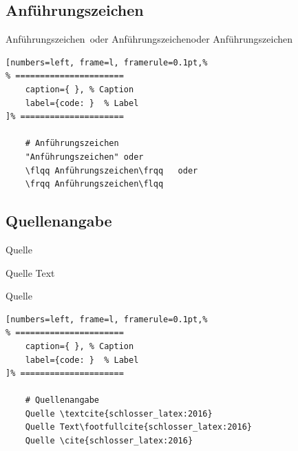 \subsection{Anführungszeichen}\label{anfuehrungszeichen}

\frqq Anführungszeichen\flqq\, oder \flqq Anführungszeichen\frqq   oder
\frqq Anführungszeichen\flqq

\lstset{language=Bash} %
\begin{lstlisting}[numbers=left, frame=l, framerule=0.1pt,%
% ======================
	caption={ }, % Caption
	label={code: }  % Label
]% =====================

    # Anführungszeichen
    "Anführungszeichen" oder
    \flqq Anführungszeichen\frqq   oder
    \frqq Anführungszeichen\flqq
\end{lstlisting}

\subsection{Quellenangabe}\label{quellenangabe}

Quelle \textcite{schlosser_latex:2016}

Quelle Text

Quelle \cite{schlosser_latex:2016}

\lstset{language=Bash} %
\begin{lstlisting}[numbers=left, frame=l, framerule=0.1pt,%
% ======================
	caption={ }, % Caption
	label={code: }  % Label
]% =====================

    # Quellenangabe
    Quelle \textcite{schlosser_latex:2016}
    Quelle Text\footfullcite{schlosser_latex:2016}
    Quelle \cite{schlosser_latex:2016}
\end{lstlisting}
